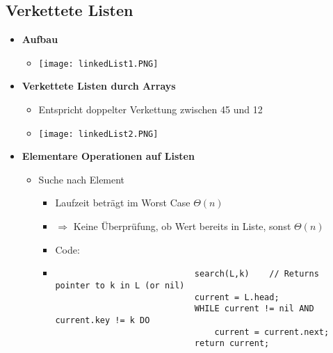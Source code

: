 \subsection{Verkettete Listen}
    \begin{itemize}
        \item \textbf{Aufbau}
            \begin{itemize}
                \item[] \texttt{[image: linkedList1.PNG]}
            \end{itemize}
        
        \item \textbf{Verkettete Listen durch Arrays}
            \begin{itemize}
                \item[] Entspricht doppelter Verkettung zwischen 45 und 12
                \item[] \texttt{[image: linkedList2.PNG]}
            \end{itemize}

        \item \textbf{Elementare Operationen auf Listen}
            \begin{itemize}
                \item Suche nach Element
                    \begin{itemize}
                        \item Laufzeit beträgt im Worst Case $\Theta(n)$
                        \item[] $\Rightarrow$ Keine Überprüfung, ob Wert bereits in Liste, sonst $\Theta(n)$
                        \item Code:
                        \item[] 
                            \begin{verbatim}
                            search(L,k)    // Returns pointer to k in L (or nil)
                            current = L.head;
                            WHILE current != nil AND current.key != k DO 
                                current = current.next;
                            return current;
                            \end{verbatim}
                    \end{itemize}


\end{itemize}
\end{itemize}
